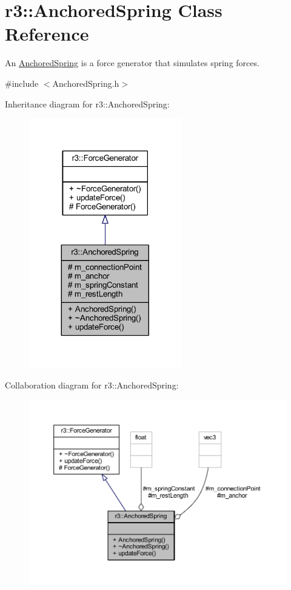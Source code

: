 \hypertarget{classr3_1_1_anchored_spring}{}\section{r3\+:\+:Anchored\+Spring Class Reference}
\label{classr3_1_1_anchored_spring}


An \mbox{\hyperlink{classr3_1_1_anchored_spring}{Anchored\+Spring}} is a force generator that simulates spring forces.  




{\ttfamily \#include $<$Anchored\+Spring.\+h$>$}



Inheritance diagram for r3\+:\+:Anchored\+Spring\+:\nopagebreak
\begin{figure}[H]
\begin{center}
\leavevmode
\includegraphics[width=188pt]{classr3_1_1_anchored_spring__inherit__graph}
\end{center}
\end{figure}


Collaboration diagram for r3\+:\+:Anchored\+Spring\+:\nopagebreak
\begin{figure}[H]
\begin{center}
\leavevmode
\includegraphics[width=350pt]{classr3_1_1_anchored_spring__coll__graph}
\end{center}
\end{figure}
